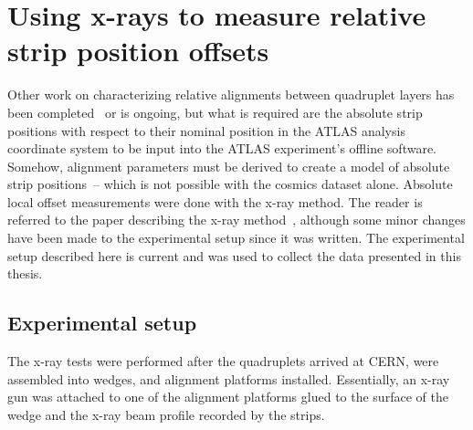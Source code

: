 
\chapter{Using x-rays to measure relative strip position offsets}
\label{chap:xray}

Other work on characterizing relative alignments between quadruplet layers has been completed~\cite{zhao_cosmic_2019} or is ongoing, but what is required are the absolute strip positions with respect to their nominal position in the ATLAS analysis coordinate system to be input into the ATLAS experiment's offline software. Somehow, alignment parameters must be derived to create a model of absolute strip positions~-- which is not possible with the cosmics dataset alone. Absolute local offset measurements were done with the x-ray method. The reader is referred to the paper describing the x-ray method~\cite{lefebvre_precision_2020}, although some minor changes have been made to the experimental setup since it was written. The experimental setup described here is current and was used to collect the data presented in this thesis.

\section{Experimental setup}

The x-ray tests were performed after the quadruplets arrived at CERN, were assembled into wedges, and alignment platforms installed. Essentially, an x-ray gun was attached to one of the alignment platforms glued to the surface of the wedge and the x-ray beam profile recorded by the strips.

